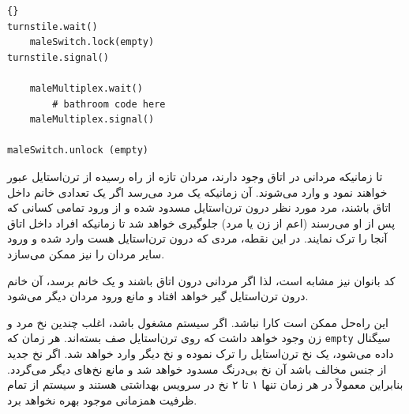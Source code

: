 \documentclass{book}
\begin{document}
\begin{latin}
\begin{lstlisting}[title=\rl{راه حل سرویس بهداشتی عمومی  بدون قحطی(آقایان)}]{}
turnstile.wait()
    maleSwitch.lock(empty)
turnstile.signal()

    maleMultiplex.wait()
        # bathroom code here
    maleMultiplex.signal()

maleSwitch.unlock (empty)
\end{lstlisting}
\end{latin}

    تا زمانیکه مردانی در اتاق وجود دارند، مردان تازه از راه رسیده از ترن‌استایل عبور خواهند نمود و وارد می‌شوند. آن زمانیکه یک مرد  می‌رسد اگر یک تعدادی خانم 
    داخل اتاق باشند، مرد مورد نظر درون ترن‌استایل مسدود شده و از ورود تمامی کسانی که پس از او می‌رسند (اعم از زن یا مرد) جلوگیری خواهد شد تا زمانیکه
    افراد داخل اتاق آنجا را ترک نمایند. در این نقطه، مردی که درون ترن‌استایل هست وارد شده و ورود سایر مردان را نیز ممکن می‌سازد. 

    کد بانوان نیز مشابه است، لذا اگر مردانی درون اتاق باشند و یک خانم برسد، آن خانم درون ترن‌استایل گیر خواهد افتاد و مانع ورود مردان دیگر می‌شود. 

    این راه‌حل ممکن است کارا نباشد. اگر سیستم مشغول باشد، اغلب چندین نخ مرد و زن وجود خواهد داشت که روی ترن‌استایل صف بسته‌اند. 
    هر زمان که {\tt empty} سیگنال داده می‌شود، یک نخ ترن‌استایل را ترک نموده و نخ دیگر وارد خواهد شد. اگر نخ جدید از جنس مخالف باشد 
    آن نخ بی‌درنگ مسدود خواهد شد و مانع نخ‌های دیگر می‌گردد. بنابراین معمولاً  در هر زمان تنها ۱ تا ۲ نخ در سرویس بهداشتی هستند و سیستم از تمام 
    ظرفیت همزمانی موجود بهره نخواهد برد. 
\end{document}
